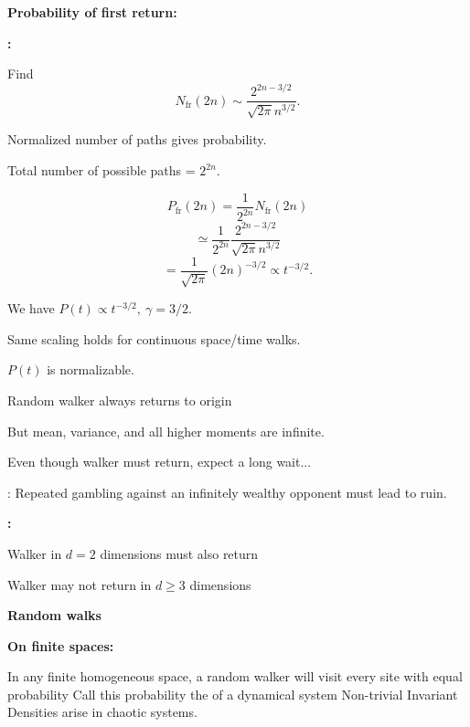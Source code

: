   \textbf{Probability of first return:}

  \textbf{:}
    
     
      Find 
      $$
      \boxed{
        N_{\textrm{fr}}(2n) \sim 
        \frac{
          2^{2n-3/2}
        }
        {
          \sqrt{2 \pi} n^{3/2}
        }.
      }
      $$
     
      Normalized number of paths gives probability.
     
      Total number of possible paths = $2^{2n}$.
    
      $$ 
      P_{\textrm{fr}}(2n) = \frac{1}{2^{2n}} N_{\textrm{fr}}(2n)
      $$
      {
        $$ 
        \simeq
        \frac{1}{2^{2n}}
        \frac{
          2^{2n-3/2}
        }
        {
          \sqrt{2 \pi} n^{3/2}
        }
        $$}
      $$
      {
        =  \frac{1}{\sqrt{2 \pi}}
        (2n)^{-3/2}
      }
      {
        \propto t^{-3/2}.
      }
      $$
    
    
  

  \small

  
  
  We have 
     $P(t) \propto t^{-3/2},\  \gamma = 3/2.$
   
    Same scaling holds for continuous space/time walks.
   
    $P(t)$ is normalizable.
   
     Random walker always returns to origin 
   
    But mean, variance, and all higher moments are infinite.
    \hfill {}
   
    Even though walker must return, expect a long wait...
   
    : 
    Repeated gambling against an infinitely wealthy opponent
    must lead to ruin.
  


\textbf{:}
  
   
    Walker in $d=2$ dimensions must also return
   
    Walker may not return in $d \ge 3$ dimensions
  
  



  \textbf{Random walks}
  
  \textbf{On finite spaces:}
    
     In any finite homogeneous space, a random walker will visit every
      site with equal probability
     Call this probability the  of
      a dynamical system
     Non-trivial Invariant Densities arise in chaotic systems.
    
